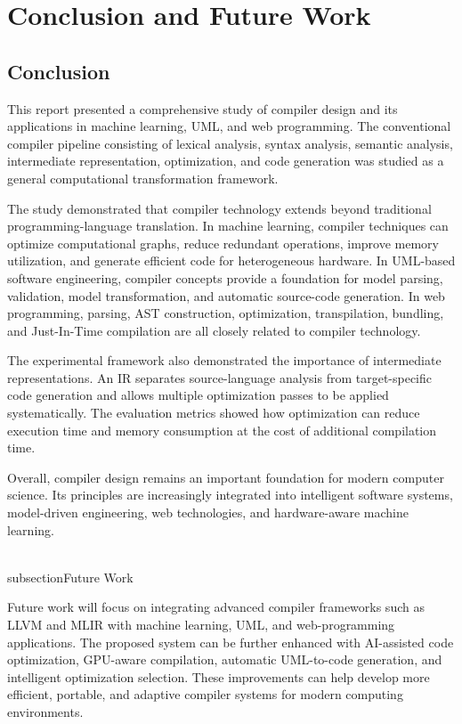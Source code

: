 \documentclass[12pt,a4paper]{article}
\begin{document}
\newpage

\section{Conclusion and Future Work}

\subsection{Conclusion}

This report presented a comprehensive study of compiler design and its
applications in machine learning, UML, and web programming. The conventional
compiler pipeline consisting of lexical analysis, syntax analysis, semantic
analysis, intermediate representation, optimization, and code generation was
studied as a general computational transformation framework.

The study demonstrated that compiler technology extends beyond traditional
programming-language translation. In machine learning, compiler techniques
can optimize computational graphs, reduce redundant operations, improve
memory utilization, and generate efficient code for heterogeneous hardware.
In UML-based software engineering, compiler concepts provide a foundation for
model parsing, validation, model transformation, and automatic source-code
generation. In web programming, parsing, AST construction, optimization,
transpilation, bundling, and Just-In-Time compilation are all closely related
to compiler technology.

The experimental framework also demonstrated the importance of intermediate
representations. An IR separates source-language analysis from target-specific
code generation and allows multiple optimization passes to be applied
systematically. The evaluation metrics showed how optimization can reduce
execution time and memory consumption at the cost of additional compilation
time.

Overall, compiler design remains an important foundation for modern computer
science. Its principles are increasingly integrated into intelligent
software systems, model-driven engineering, web technologies, and
hardware-aware machine learning.

\\subsection{Future Work}

Future work will focus on integrating advanced compiler frameworks such as LLVM and MLIR with machine learning, UML, and web-programming applications. The proposed system can be further enhanced with AI-assisted code optimization, GPU-aware compilation, automatic UML-to-code generation, and intelligent optimization selection. These improvements can help develop more efficient, portable, and adaptive compiler systems for modern computing environments.
\end{document}
